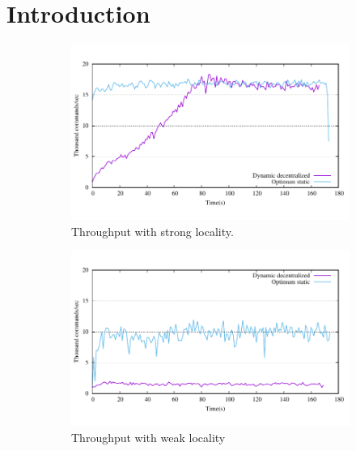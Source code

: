 \section{Introduction}


\begin{figure}[ht!]
  \centering
  \begin{subfigure}[b]{0.45\textwidth}
    \centering
    \includegraphics[width=0.95\columnwidth]{figures/motivation-tp-strong-locality}    
    \caption{Throughput with strong locality.}
  \end{subfigure}
  \begin{subfigure}[b]{0.45\textwidth}
    \centering
    \includegraphics[width=0.95\columnwidth]{figures/motivation-tp-weak-locality}
    \caption{Throughput with weak locality}
  \end{subfigure} \\
  \begin{subfigure}[b]{0.45\textwidth}
    \centering

\end{subfigure}
\end{figure}
